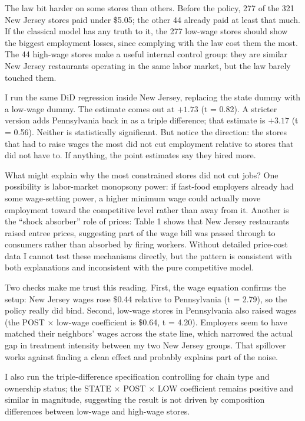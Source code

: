 \documentclass[11pt]{article}
\begin{document}
The law bit harder on some stores than others. Before the policy, 277 of the 321 New Jersey stores paid under \$5.05; the other 44 already paid at least that much. If the classical model has any truth to it, the 277 low-wage stores should show the biggest employment losses, since complying with the law cost them the most. The 44 high-wage stores make a useful internal control group: they are similar New Jersey restaurants operating in the same labor market, but the law barely touched them.

I run the same DiD regression inside New Jersey, replacing the state dummy with a low-wage dummy. The estimate comes out at $+1.73$ (t = 0.82). A stricter version adds Pennsylvania back in as a triple difference; that estimate is $+3.17$ (t = 0.56). Neither is statistically significant. But notice the direction: the stores that had to raise wages the most did not cut employment relative to stores that did not have to. If anything, the point estimates say they hired more.

What might explain why the most constrained stores did not cut jobs? One possibility is labor-market monopsony power: if fast-food employers already had some wage-setting power, a higher minimum wage could actually move employment toward the competitive level rather than away from it. Another is the ``shock absorber'' role of prices: Table 1 shows that New Jersey restaurants raised entree prices, suggesting part of the wage bill was passed through to consumers rather than absorbed by firing workers. Without detailed price-cost data I cannot test these mechanisms directly, but the pattern is consistent with both explanations and inconsistent with the pure competitive model.

Two checks make me trust this reading. First, the wage equation confirms the setup: New Jersey wages rose \$0.44 relative to Pennsylvania (t = 2.79), so the policy really did bind. Second, low-wage stores in Pennsylvania also raised wages (the POST $\times$ low-wage coefficient is \$0.64, t = 4.20). Employers seem to have matched their neighbors' wages across the state line, which narrowed the actual gap in treatment intensity between my two New Jersey groups. That spillover works against finding a clean effect and probably explains part of the noise.

I also run the triple-difference specification controlling for chain type and ownership status; the STATE $\times$ POST $\times$ LOW coefficient remains positive and similar in magnitude, suggesting the result is not driven by composition differences between low-wage and high-wage stores.
\end{document}
